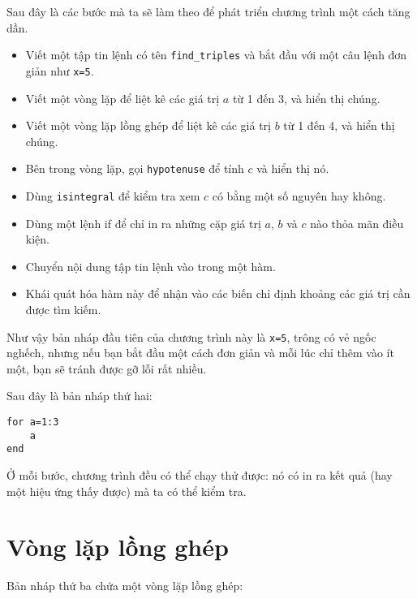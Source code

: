 \documentclass[12pt]{book}
\begin{document}
Sau đây là các bước mà ta sẽ làm theo để phát triển chương trình
một cách tăng dần.

\begin{itemize}

\item Viết một tập tin lệnh có tên \verb#find_triples# và bắt đầu
với một câu lệnh đơn giản như {\tt x=5}.

\item Viết một vòng lặp để liệt kê các giá trị $a$ từ 1 đến 3, và
hiển thị chúng.

\item Viết một vòng lặp lồng ghép để liệt kê các giá trị $b$ từ 1 đến 4,
và hiển thị chúng.

\item Bên trong vòng lặp, gọi {\tt hypotenuse} để tính $c$ và
hiển thị nó.

\item Dùng {\tt isintegral} để kiểm tra xem $c$ có bằng một số nguyên
hay không.

\item Dùng một lệnh if để chỉ in ra những cặp giá trị $a$, $b$ và $c$
nào thỏa mãn điều kiện.

\item Chuyển nội dung tập tin lệnh vào trong một hàm.

\item Khái quát hóa hàm này để nhận vào các biến chỉ định khoảng các
giá trị cần được tìm kiếm.

\end{itemize}

Như vậy bản nháp đầu tiên của chương trình này là {\tt x=5}, 
trông có vẻ ngốc nghếch, nhưng nếu bạn bắt đầu một cách đơn giản và
mỗi lúc chỉ thêm vào ít một, bạn sẽ tránh được gỡ lỗi rất nhiều.

Sau đây là bản nháp thứ hai:

\begin{verbatim}
for a=1:3
    a
end
\end{verbatim}

Ở mỗi bước, chương trình đều có thể chạy thử được: nó có in ra kết quả
(hay một hiệu ứng thấy được) mà ta có thể kiểm tra.


\section{Vòng lặp lồng ghép}

Bản nháp thứ ba chứa một vòng lặp lồng ghép:
\end{document}
